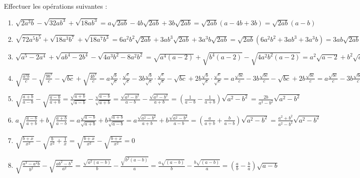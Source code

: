 \begin{solution}
Effectuer les opérations suivantes :
\begin{enumerate}
\item $\sqrt{2{{a}^{3}}b}-\sqrt{32a{{b}^{3}}}+\sqrt{18a{{b}^{3}}}=a\sqrt{2ab}-4b\sqrt{2ab}+3b\sqrt{2ab}=\sqrt{2ab}\left( a-4b+3b \right)=\sqrt{2ab}\left( a-b \right)$
\item $\sqrt{72{{a}^{5}}{{b}^{5}}}+\sqrt{18{{a}^{3}}{{b}^{7}}}+\sqrt{18{{a}^{7}}{{b}^{3}}}=6{{a}^{2}}{{b}^{2}}\sqrt{2ab}+3a{{b}^{3}}\sqrt{2ab}+3{{a}^{3}}b\sqrt{2ab}=\sqrt{2ab}\left( 6{{a}^{2}}{{b}^{2}}+3a{{b}^{3}}+3{{a}^{3}}b \right)=3ab\sqrt{2ab}\left( 2ab+{{b}^{2}}+{{a}^{2}} \right)=3ab\sqrt{2ab}{{\left( a+b \right)}^{2}}$
\item $\sqrt{{{a}^{5}}-2{{a}^{4}}}+\sqrt{a{{b}^{4}}-2{{b}^{4}}}-\sqrt{4{{a}^{3}}{{b}^{2}}-8{{a}^{2}}{{b}^{2}}}=\sqrt{{{a}^{4}}(a-2)}+\sqrt{{{b}^{4}}\left( a-2 \right)}-\sqrt{4{{a}^{2}}{{b}^{2}}(a-2)}={{a}^{2}}\sqrt{a-2}+{{b}^{2}}\sqrt{a-2}-2ab\sqrt{a-2}=\sqrt{a-2}\left( {{a}^{2}}-2ab+{{b}^{2}} \right)=\sqrt{a-2}{{\left( a-b \right)}^{2}}$
\item $\sqrt{\frac{{{a}^{2}}b}{c}}-\sqrt{\frac{9{{b}^{3}}}{c}}-\sqrt{bc}+\sqrt{\frac{4{{b}^{3}}}{c}}=a\frac{\sqrt{b}}{\sqrt{c}}\cdot \frac{\sqrt{c}}{\sqrt{c}}-3b\frac{\sqrt{b}}{\sqrt{c}}\cdot \frac{\sqrt{c}}{\sqrt{c}}-\sqrt{bc}+2b\frac{\sqrt{b}}{\sqrt{c}}\cdot \frac{\sqrt{c}}{\sqrt{c}}=a\frac{\sqrt{bc}}{c}-3b\frac{\sqrt{bc}}{c}-\sqrt{bc}+2b\frac{\sqrt{bc}}{c}=a\frac{\sqrt{bc}}{c}-3b\frac{\sqrt{bc}}{c}-\frac{c\sqrt{bc}}{c}+2b\frac{\sqrt{bc}}{c}=\frac{\sqrt{bc}}{c}\left( a-3b-c+2b \right)=\frac{\sqrt{bc}}{c}\left( a-b-c \right)$
\item $\sqrt{\frac{a+b}{a-b}}-\sqrt{\frac{a-b}{a+b}}=\frac{\sqrt{a+b}}{\sqrt{a-b}}-\frac{\sqrt{a-b}}{\sqrt{a+b}}=\frac{\sqrt{{{a}^{2}}-{{b}^{2}}}}{a-b}-\frac{\sqrt{{{a}^{2}}-{{b}^{2}}}}{a+b}=\left( \frac{1}{a-b}-\frac{1}{a+b} \right)\sqrt{{{a}^{2}}-{{b}^{2}}}=\frac{2b}{{{a}^{2}}-{{b}^{2}}}\sqrt{{{a}^{2}}-{{b}^{2}}}$
\item $a\sqrt{\frac{a-b}{a+b}}+b\sqrt{\frac{a+b}{a-b}}=a\frac{\sqrt{a-b}}{\sqrt{a+b}}+b\frac{\sqrt{a+b}}{\sqrt{a-b}}=a\frac{\sqrt{{{a}^{2}}-{{b}^{2}}}}{a+b}+b\frac{\sqrt{{{a}^{2}}-{{b}^{2}}}}{a-b}=\left( \frac{a}{a+b}+\frac{b}{a-b} \right)\sqrt{{{a}^{2}}-{{b}^{2}}}=\frac{{{a}^{2}}+{{b}^{2}}}{{{a}^{2}}-{{b}^{2}}}\sqrt{{{a}^{2}}-{{b}^{2}}}$
\item $\sqrt{\frac{b+x}{{{x}^{2}}}}-\sqrt{\frac{b}{{{x}^{2}}}+\frac{1}{x}}=\sqrt{\frac{b+x}{{{x}^{2}}}}-\sqrt{\frac{b+x}{{{x}^{2}}}}=0$
\item $\sqrt{\frac{{{a}^{3}}-{{a}^{2}}b}{{{b}^{2}}}}-\sqrt{\frac{a{{b}^{2}}-{{b}^{3}}}{{{a}^{2}}}}=\frac{\sqrt{{{a}^{2}}(a-b)}}{b}-\frac{\sqrt{{{b}^{2}}(a-b)}}{a}=\frac{a\sqrt{(a-b)}}{b}-\frac{b\sqrt{(a-b)}}{a}=\left( \frac{a}{b}-\frac{b}{a} \right)\sqrt{a-b}$
\end{enumerate}
\end{solution}

